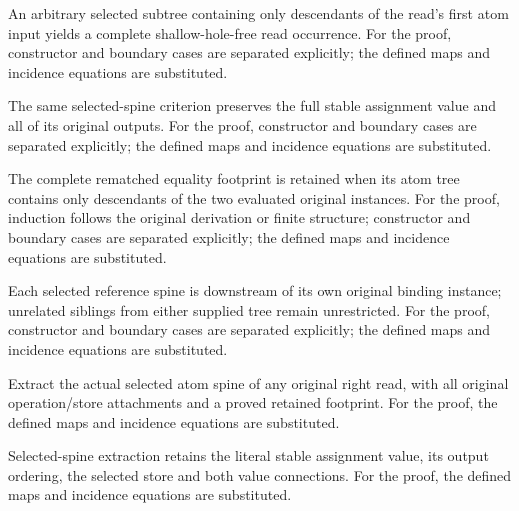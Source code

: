 An arbitrary selected subtree containing only descendants of the read's first atom input yields a complete shallow-hole-free read occurrence.
For the proof, constructor and boundary cases are separated explicitly; the defined maps and incidence equations are substituted.
\par{}

The same selected-spine criterion preserves the full stable assignment value and all of its original outputs.
For the proof, constructor and boundary cases are separated explicitly; the defined maps and incidence equations are substituted.
\par{}

The complete rematched equality footprint is retained when its atom tree contains only descendants of the two evaluated original instances.
For the proof, induction follows the original derivation or finite structure; constructor and boundary cases are separated explicitly; the defined maps and incidence equations are substituted.
\par{}

Each selected reference spine is downstream of its own original binding instance; unrelated siblings from either supplied tree remain unrestricted.
For the proof, constructor and boundary cases are separated explicitly; the defined maps and incidence equations are substituted.
\par{}

Extract the actual selected atom spine of any original right read, with all original operation/store attachments and a proved retained footprint.
For the proof, the defined maps and incidence equations are substituted.
\par{}

Selected-spine extraction retains the literal stable assignment value, its output ordering, the selected store and both value connections.
For the proof, the defined maps and incidence equations are substituted.
\par{}


